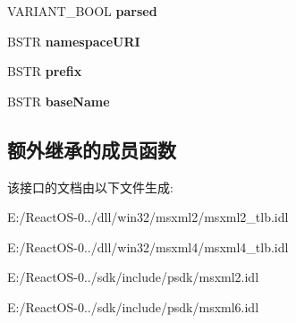\begin{DoxyCompactItemize}
V\+A\+R\+I\+A\+N\+T\+\_\+\+B\+O\+OL {\bfseries parsed}
\item 
\mbox{\label{interface_m_s_x_m_l2_1_1_i_x_m_l_d_o_m_node_a2a82b99bf1bd82f5b71eec4c7c6f209c}} 
B\+S\+TR {\bfseries namespace\+U\+RI}
\item 
\mbox{\label{interface_m_s_x_m_l2_1_1_i_x_m_l_d_o_m_node_a1cbde04fa8073d638fa39d86c98f8fdb}} 
B\+S\+TR {\bfseries prefix}
\item 
\mbox{\label{interface_m_s_x_m_l2_1_1_i_x_m_l_d_o_m_node_a93c88cafbeaeba4d5f61a1158c90a231}} 
B\+S\+TR {\bfseries base\+Name}
\end{DoxyCompactItemize}
\subsection*{额外继承的成员函数}


该接口的文档由以下文件生成\+:\begin{DoxyCompactItemize}
\item 
E\+:/\+React\+O\+S-\/0../dll/win32/msxml2/msxml2\+\_\+tlb.\+idl\item 
E\+:/\+React\+O\+S-\/0../dll/win32/msxml4/msxml4\+\_\+tlb.\+idl\item 
E\+:/\+React\+O\+S-\/0../sdk/include/psdk/msxml2.\+idl\item 
E\+:/\+React\+O\+S-\/0../sdk/include/psdk/msxml6.\+idl\end{DoxyCompactItemize}
